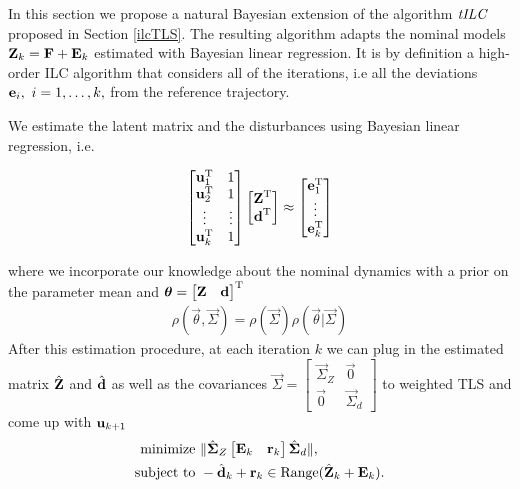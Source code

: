 In this section we propose a natural Bayesian extension of the algorithm $\emph{tILC}$ proposed in Section \ref{ilcTLS}. The resulting algorithm adapts the nominal models $\boldsymbol{\mathrm{Z}}_k = \boldsymbol{\mathrm{F}} + \boldsymbol{\mathrm{E}}_k$ estimated with Bayesian linear regression. It is by definition a high-order ILC algorithm that considers all of the iterations, i.e all the deviations $\boldsymbol{\mathrm{e}}_i, \ i = 1, \ldots, k,$ from the reference trajectory. 

We estimate the latent matrix and the disturbances using Bayesian linear regression, i.e.

\begin{align}
\begin{bmatrix} \boldsymbol{\mathrm{u}}_1^{\mathrm{T}} & 1 \\ \boldsymbol{\mathrm{u}}_2^{\mathrm{T}} & 1 \\ \vdots & \vdots \\ \boldsymbol{\mathrm{u}}_k^{\mathrm{T}} & 1 \end{bmatrix} \begin{bmatrix}
\boldsymbol{\mathrm{Z}}^{\mathrm{T}} \\ \boldsymbol{\mathrm{d}}^{\mathrm{T}}
\end{bmatrix} \approx \begin{bmatrix}
\boldsymbol{\mathrm{e}}_1^{\mathrm{T}} \\ \vdots \\ \boldsymbol{\mathrm{e}}_k^{\mathrm{T}}
\end{bmatrix}
\end{align}

where we incorporate our knowledge about the nominal dynamics with a prior on the parameter mean and  $\boldsymbol{\mathrm{\theta}} = \begin{bmatrix}
\boldsymbol{\mathrm{Z}} & \boldsymbol{\mathrm{d}} \end{bmatrix}^{\mathrm{T}}$
%
\begin{align}
\rho(\vec{\theta},\vec{\Sigma}) = \rho(\vec{\Sigma})\rho(\vec{\theta}|\vec{\Sigma})
\end{align}
%
After this estimation procedure, at each iteration $k$ we can plug in the estimated matrix $\hat{\boldsymbol{\mathrm{Z}}}$ and $\hat{\boldsymbol{\mathrm{d}}}$ as well as the covariances $\vec{\Sigma} = \begin{bmatrix}
\vec{\Sigma}_Z & \vec{0} \\ \vec{0} & \vec{\Sigma}_d
\end{bmatrix}$ to weighted TLS and come up with $\boldsymbol{\mathrm{u}}_{k+1}$
%
\begin{equation}
\begin{aligned}
\text{minimize} &\ \| \hat{\boldsymbol{\mathrm{\Sigma}}}_Z \begin{bmatrix} \boldsymbol{\mathrm{E}}_k & \boldsymbol{\mathrm{r}}_k \end{bmatrix} \hat{\boldsymbol{\mathrm{\Sigma}}}_d \|, \\
\text{subject to} &\ -\hat{\boldsymbol{\mathrm{d}}}_k + \boldsymbol{\mathrm{r}}_k \in \text{Range}(\hat{\boldsymbol{\mathrm{Z}}}_k + \boldsymbol{\mathrm{E}}_k).
\end{aligned}
\end{equation}




